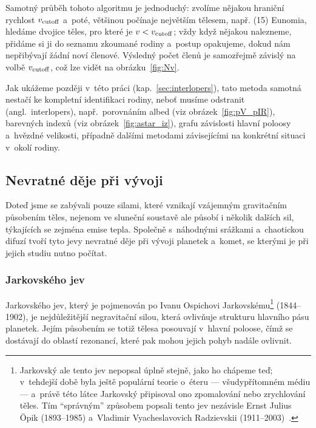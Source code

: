 \documentclass[A4paper, 12pt, oneside]{book}
\begin{document}
Samotný průběh tohoto algoritmu je jednoduchý: zvolíme nějakou hraniční rychlost $v_{\rm cutoff}$ a~poté, většinou počínaje největším tělesem, např. (15) Eunomia, hledáme dvojice těles, pro které je $v<v_{\rm cutoff}$; vždy když nějakou nalezneme, přidáme si ji do seznamu zkoumané rodiny a~postup opakujeme, dokud nám nepřibývají žádní noví členové. Výsledný počet členů je samozřejmě závislý na volbě $v_{\rm cutoff}$, což lze vidět na obrázku~\ref{fig:Nv}.

Jak ukážeme později v~této práci (kap.~\ref{sec:interlopers}), tato metoda samotná nestačí ke kompletní identifikaci rodiny, neboť musíme odstranit  (angl.\ interlopers), např.\ porovnáním albed (viz obrázek~\ref{fig:pV_pIR}), barevných indexů (viz obrázek~\ref{fig:astar_iz}), grafu závislosti hlavní poloosy a~hvězdné velikosti, případně dalšími metodami závisejícími na konkrétní situaci v~okolí rodiny.

\subsection{Nevratné děje při vývoji}

Doteď jsme se zabývali pouze silami, které vznikají vzájemným gravitačním působením těles, nejenom ve sluneční soustavě ale působí i několik dalších sil, týkajících se zejména emise tepla. Společně s~náhodnými srážkami a~chaotickou difuzí tvoří tyto jevy nevratné děje při vývoji planetek a~komet, se kterými je při jejich studiu nutno počítat.

\subsubsection{Jarkovského jev} \label{sec:jarko}
Jarkovského jev, který je pojmenován po Ivanu Ospichovi Jarkovskému\footnote{Jarkovský ale tento jev nepopsal úplně stejně, jako ho chápeme teď; v~tehdejší době byla ještě populární teorie o~éteru --- všudypřítomném médiu --- a~právě této látce Jarkovský připisoval ono zpomalování nebo zrychlování těles. Tím \enquote{správným} způsobem popsali tento jev nezávisle Ernst Julius Öpik (1893--1985) a~Vladimir Vyacheslavovich Radzievskii (1911--2003)~\cite{brozphd}.}  (1844--1902), je nejdůležitější negravitační silou, která ovlivňuje strukturu hlavního pásu planetek. Jejím působením se totiž tělesa posouvají v~hlavní poloose, čímž se dostávají do oblastí rezonancí, které pak mohou jejich pohyb nadále ovlivnit.
\end{document}
